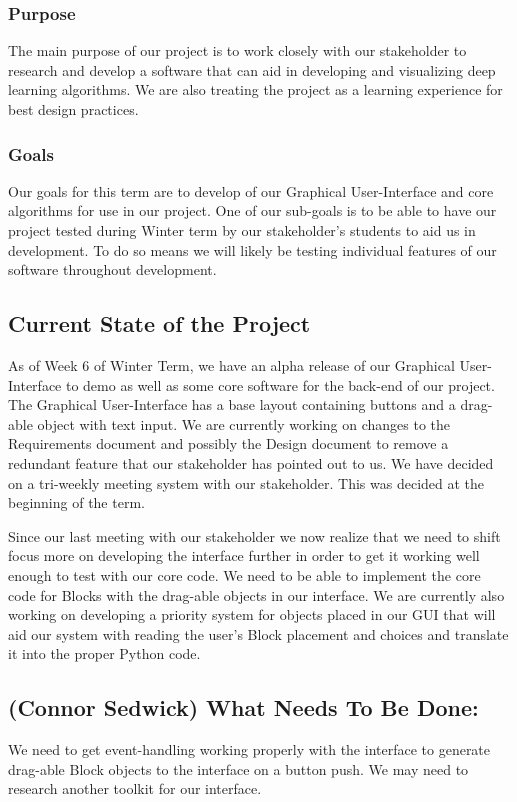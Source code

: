 \documentclass[journal,10pt,onecolumn,compsoc]{IEEEtran} \usepackage[margin=1.0in]{geometry} \usepackage{pdfpages}
\begin{document}
\subsubsection{Purpose}
The main purpose of our project is to work closely with our stakeholder to research and develop a software that can aid in developing and visualizing deep learning algorithms.
We are also treating the project as a learning experience for best design practices.
\subsubsection{Goals}
Our goals for this term are to develop of our Graphical User-Interface and core algorithms for use in our project. 
One of our sub-goals is to be able to have our project tested during Winter term by our stakeholder's students to aid us in development.
To do so means we will likely be testing individual features of our software throughout development.
\subsection{Current State of the Project}
As of Week 6 of Winter Term, we have an alpha release of our Graphical User-Interface to demo as well as some core software for the back-end of our project.
The Graphical User-Interface has a base layout containing buttons and a drag-able object with text input. 
We are currently working on changes to the Requirements document and possibly the Design document to remove a redundant feature that our stakeholder has pointed out to us.
We have decided on a tri-weekly meeting system with our stakeholder. 
This was decided at the beginning of the term.

\noindent Since our last meeting with our stakeholder we now realize that we need to shift focus more on developing the interface further in order to get it working well enough to test with our core code.
We need to be able to implement the core code for Blocks with the drag-able objects in our interface.
We are currently also working on developing a priority system for objects placed in our GUI that will aid our system with reading the user's Block placement and choices and translate it into the proper Python code.

\subsection{(Connor Sedwick) What Needs To Be Done:}
We need to get event-handling working properly with the interface to generate drag-able Block objects to the interface on a button push. 
We may need to research another toolkit for our interface.
\end{document}
